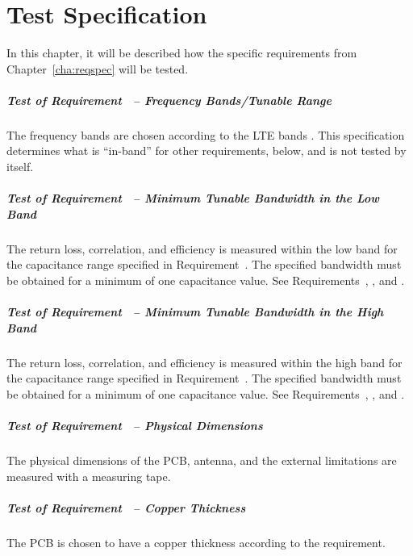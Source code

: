\chapter{Test Specification}
\label{cha:testspec}
In this chapter, it will be described how the specific requirements from Chapter~\ref{cha:reqspec} will be tested.

\paragraph{Test of Requirement~ -- Frequency Bands/Tunable Range}
The frequency bands are chosen according to the LTE bands \cite{radio2015electronics}. This specification determines what is ``in-band'' for other requirements, below, and is not tested by itself.

\paragraph{Test of Requirement~ -- Minimum Tunable Bandwidth in the Low Band}
The return loss, correlation, and efficiency is measured within the low band for the capacitance range specified in Requirement~. The specified bandwidth must be obtained for a minimum of one capacitance value. See Requirements~, , and .

\paragraph{Test of Requirement~ -- Minimum Tunable Bandwidth in the High Band}
The return loss, correlation, and efficiency is measured within the high band for the capacitance range specified in Requirement~. The specified bandwidth must be obtained for a minimum of one capacitance value. See Requirements~, , and .

\paragraph{Test of Requirement~ -- Physical Dimensions}
The physical dimensions of the PCB, antenna, and the external limitations are measured with a measuring tape. 

\paragraph{Test of Requirement~ -- Copper Thickness}
The PCB is chosen to have a copper thickness according to the requirement.

